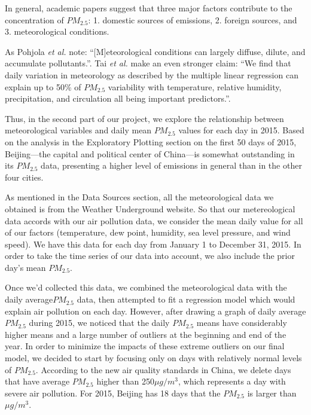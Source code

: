 \documentclass[11pt]{article} %
\begin{document}
In general, academic papers\cite{Chatani11, Tai10, Pohjola02} suggest that three major factors contribute to the concentration of \(PM_{2.5}\): 1. domestic sources of emissions, 2. foreign sources, and 3. meteorological conditions.

As Pohjola \textit{et al.} note: “[M]eteorological conditions can largely diffuse, dilute, and accumulate pollutants.”\cite{Pohjola02}. Tai \textit{et al.} make an even stronger claim: “We find that daily variation in meteorology as described by the multiple linear regression can explain up to 50\% of \(PM_{2.5}\) variability with temperature, relative humidity, precipitation, and circulation all being important predictors.”\cite{Tai10}.
 
Thus, in the second part of our project, we explore the relationship between meteorological variables and daily mean \(PM_{2.5}\) values for each day in 2015. 
Based on the analysis in the Exploratory Plotting section on the first 50 days of 2015, Beijing---the capital and political center of China---is somewhat outstanding in its \(PM_{2.5}\) data, presenting a higher level of emissions in general than in the other four cities.

As mentioned in the Data Sources section, all the meteorological data we obtained is from the Weather Underground website. So that our metereological data accords with our air pollution data, we consider the mean daily value for all of our factors (temperature, dew point, humidity, sea level pressure, and wind speed). We have this data for each day from January 1 to December 31, 2015. In order to take the time series of our data into account, we also include the prior day's mean \(PM_{2.5}\).

Once we'd collected this data, we combined the meteorological data with the daily average\(PM_{2.5}\) data, then attempted to fit a regression model which would explain air pollution on each day. However, after drawing a graph of daily average \(PM_{2.5}\) during 2015, we noticed that the daily \(PM_{2.5}\) means have considerably higher means and a large number of outliers at the beginning and end of the year. In order to minimize the impacts of these extreme outliers on our final model, we decided to start by focusing only on days with relatively normal levels of \(PM_{2.5}\). According to the new air quality standards in China, we delete days that have average \(PM_{2.5}\) higher than 250\(\mu g/m^3\), which represents a day with severe air pollution. For 2015, Beijing has 18 days that the \(PM_{2.5}\) is larger than \(\mu g/m^3\).
\end{document}
